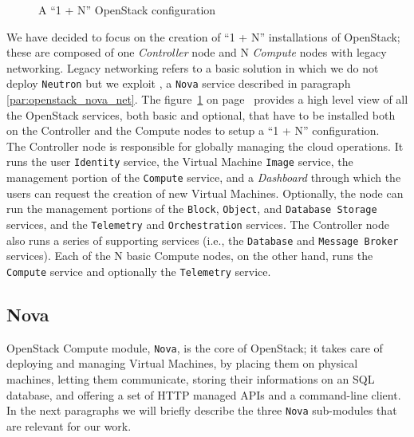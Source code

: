 \begin{figure}[!ht]
\label{fig:openstack_1plusN}
\caption{A ``1 + N'' OpenStack configuration}
\end{figure}

We have decided to focus on the creation of ``1 + N'' installations of OpenStack; these are composed of one \textit{Controller} node and N \textit{Compute} nodes with legacy networking. Legacy networking refers to a basic solution in which we do not deploy \texttt{Neutron} but we exploit , a \texttt{Nova} service described in paragraph \ref{par:openstack_nova_net}. The figure~\ref{fig:openstack_1plusN} on page~\pageref{fig:openstack_1plusN} provides a high level view of all the OpenStack services, both basic and optional, that have to be installed both on the Controller and the Compute nodes to setup a ``1 + N'' configuration.\\ 
The Controller node is responsible for globally managing the cloud operations. It runs the user \texttt{Identity} service, the Virtual Machine \texttt{Image} service, the management portion of the \texttt{Compute} service, and a \textit{Dashboard} through which the users can request the creation of new Virtual Machines. Optionally, the node can run the management portions of the \texttt{Block}, \texttt{Object}, and \texttt{Database Storage} services, and the \texttt{Telemetry} and \texttt{Orchestration} services. The Controller node also runs a series of supporting services (i.e., the \texttt{Database} and \texttt{Message Broker} services). Each of the N basic Compute nodes, on the other hand, runs the \texttt{Compute} service and optionally the \texttt{Telemetry} service.

\subsection{Nova}
\label{sec:openstack_nova}
OpenStack Compute module, \texttt{Nova}, is the core of OpenStack; it takes care of deploying and managing Virtual Machines, by placing them on physical machines, letting them communicate, storing their informations on an SQL database, and offering a set of HTTP managed APIs and a command-line client.
In the next paragraphs we will briefly describe the three \texttt{Nova} sub-modules that are relevant for our work.

